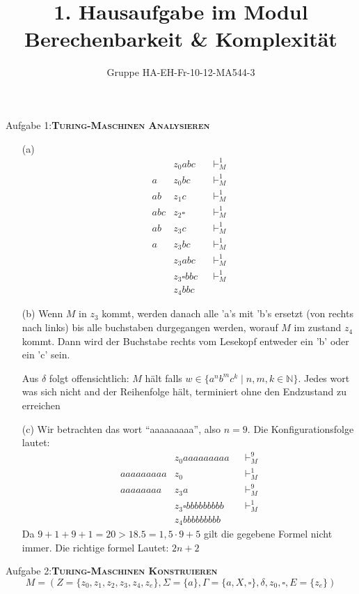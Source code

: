 \documentclass[a4paper,onecolumn,oneside,12pt,ngerman]{article}
\date{}
\title{1. Hausaufgabe im Modul \\ \glqq Berechenbarkeit \& Komplexität\grqq} %
\author{Gruppe HA-EH-Fr-10-12-MA544-3} %
\theoremstyle{plain} %
\theoremstyle{definition} %
\theoremstyle{remark} %
\theoremstyle{plain}
\newcommand{\NN}{\mathbb{N}} %
\newcommand{\tstep}[1][1]{\vdash^#1_M} %
\begin{document}

\maketitle
\newpage
Aufgabe 1:\quad\textsc{\textbf{Turing-Maschinen Analysieren}}
\begin{enumerate}
    \item[(a)]
    \begin{align*}
    &z_0abc  &&\tstep  \\
    a&z_0bc   &&\tstep  \\
    ab&z_1c    &&\tstep  \\
    abc&z_2\square     &&\tstep  \\
    ab&z_3c    &&\tstep  \\
    a&z_3bc   &&\tstep  \\
    &z_3abc  &&\tstep  \\
    &z_3\square bbc  &&\tstep \\
    &z_4bbc
    \end{align*}
    
    \item[(b)] 
    Wenn $M$ in $z_3$ kommt, werden danach alle 'a's mit 'b's ersetzt (von rechts nach links) bis alle buchstaben durgegangen werden, worauf $M$ im zustand $z_4$ kommt. Dann wird der Buchstabe rechts vom Lesekopf entweder ein 'b' oder ein 'c' sein.

    Aus $\delta$ folgt offensichtlich: $M$ hält falls $w\in \{a^nb^mc^k\mid n,m,k \in \NN\}$. Jedes wort was sich nicht and der Reihenfolge hält, terminiert ohne den Endzustand zu erreichen
    \item[(c)] 
    Wir betrachten das wort \enquote{aaaaaaaaa}, also $n=9$. Die Konfigurationsfolge lautet:
    \begin{align*}
    &z_0aaaaaaaaa          &&\tstep[9]  \\
    aaaaaaaaa&z_0         &&\tstep  \\
    aaaaaaaa&z_3a         &&\tstep[9]  \\
    &z_3\square bbbbbbbbb  &&\tstep  \\
    &z_4bbbbbbbbb
\end{align*}
    Da $9+1+9+1 = 20 > 18.5 = 1,5\cdot 9 + 5$ gilt die gegebene Formel nicht immer. Die richtige formel Lautet: $2n+2$
\end{enumerate}
\newpage
Aufgabe 2:\quad \textsc{\textbf{Turing-Maschinen Konstruieren}}
\[ M = (Z = \{z_0, z_1, z_2, z_3, z_4, z_e\}, \Sigma = \{a\}, \Gamma = \{a,X,\square\},\delta, z_0, \square, E = \{z_e\}) \]
\end{document}
